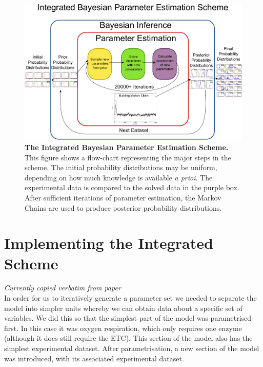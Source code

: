 \begin{landscape}
\begin{figure}[tbp]
 \centering
 \includegraphics[width=20.4cm]{./03-parameterestimationmethodologies/data/paramest.pdf}
 \caption[{The Integrated Bayesian Parameter Estimation Scheme}]{{\bf The Integrated Bayesian Parameter Estimation Scheme.} This figure shows a flow-chart representing the major steps in the scheme. The initial probability distributions may be uniform, depending on how much knowledge is available \textit{a prioi}. The experimental data is compared to the solved data in the purple box. After sufficient iterations of parameter estimation, the Markov Chains are used to produce posterior probability distributions.
 \label{fig:intscheme}}
\end{figure}
\end{landscape}

\section{Implementing the Integrated Scheme}
\emph{Currently copied verbatim from paper}\\
In order for us to iteratively generate a parameter set we needed to separate the model into simpler units whereby we can obtain data about a specific set of variables. We did this so that the simplest part of the model was parametrised first. In this case it was oxygen respiration, which only requires one enzyme (although it does still require the ETC). This section of the model also has the simplest experimental dataset. After parametrisation, a new section of the model was introduced, with its associated experimental dataset.

